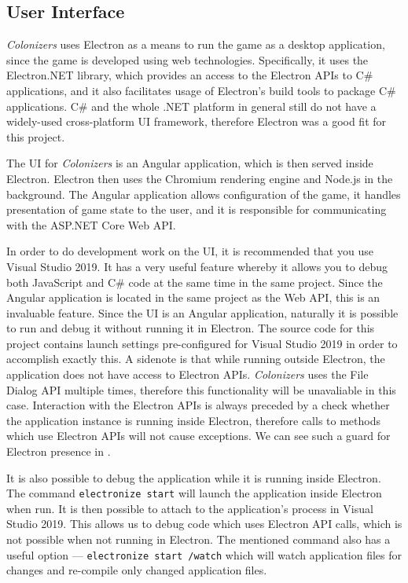 \subsection{User Interface}

\emph{Colonizers} uses Electron as a means to run the game as a desktop application,
since the game is developed using web technologies. Specifically, it uses the
Electron.NET library, which provides an access to the Electron APIs to C\# applications,
and it also facilitates usage of Electron's build tools to package C\# applications.
C\# and the whole .NET platform in general still do not have a widely-used cross-platform
UI framework, therefore Electron was a good fit for this project.

The UI for \emph{Colonizers} is an Angular application, which is then served inside
Electron. Electron then uses the Chromium rendering engine and Node.js in the background.
The Angular application allows configuration of the game, it handles presentation
of game state to the user, and it is responsible for communicating with the
ASP.NET Core Web API.

In order to do development work on the UI, it is recommended that you use
Visual Studio 2019. It has a very useful feature whereby it allows you to debug
both JavaScript and C\# code at the same time in the same project. Since the Angular
application is located in the same project as the Web API, this is an invaluable
feature. Since the UI is an Angular application, naturally it is possible
to run and debug it without running it in Electron. The source code for this project
contains launch settings pre-configured for Visual Studio 2019 in order to accomplish
exactly this. A sidenote is that while running outside Electron, the application
does not have access to Electron APIs. \emph{Colonizers} uses the File Dialog
API multiple times, therefore this functionality will be unavaliable in this case.
Interaction with the Electron APIs is always preceded by a check whether
the application instance is running inside Electron, therefore calls
to methods which use Electron APIs will not cause exceptions. We can see
such a guard for Electron presence in .

It is also possible to debug the application while it is running inside Electron.
The command \texttt{electronize start} will launch the application
inside Electron when run. It is then possible to attach to the application's
process in Visual Studio 2019. This allows us to debug code which uses Electron
API calls, which is not possible when not running in Electron. The mentioned
command also has a useful option --- \texttt{electronize start /watch}
which will watch application files
for changes and re-compile only changed application files.


